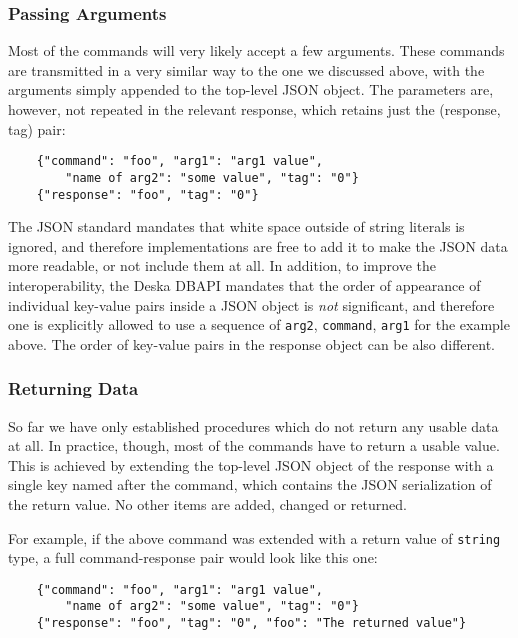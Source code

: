 \documentclass{article}
\begin{document}
\subsubsection{Passing Arguments}

Most of the commands will very likely accept a few arguments.  These commands are transmitted in a very similar way to
the one we discussed above, with the arguments simply appended to the top-level JSON object.  The parameters are,
however, not repeated in the relevant response, which retains just the (response, tag) pair:

\begin{lstlisting}
    {"command": "foo", "arg1": "arg1 value",
        "name of arg2": "some value", "tag": "0"}
    {"response": "foo", "tag": "0"}
\end{lstlisting}

The JSON standard mandates that white space outside of string literals is ignored, and therefore implementations are
free to add it to make the JSON data more readable, or not include them at all.  In addition, to improve the
interoperability, the Deska DBAPI mandates that the order of appearance of individual key-value pairs inside a JSON
object is {\em not} significant, and therefore one is explicitly allowed to use a sequence of {\tt arg2}, {\tt command},
{\tt arg1} for the example above.  The order of key-value pairs in the response object can be also different.

\subsubsection{Returning Data}

So far we have only established procedures which do not return any usable data at all.  In practice, though, most of the
commands have to return a usable value.  This is achieved by extending the top-level JSON object of the response with a
single key named after the command, which contains the JSON serialization of the return value.  No other items are
added, changed or returned.

For example, if the above command was extended with a return value of {\tt string} type, a full command-response pair
would look like this one:

\begin{lstlisting}
    {"command": "foo", "arg1": "arg1 value",
        "name of arg2": "some value", "tag": "0"}
    {"response": "foo", "tag": "0", "foo": "The returned value"}
\end{lstlisting}
\end{document}
